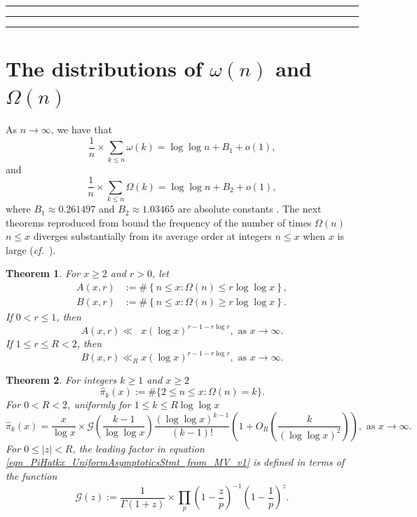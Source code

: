 \documentclass[11pt,reqno,a4letter]{article}
\numberwithin{equation}{section}
\numberwithin{figure}{section}
\numberwithin{table}{section}
\newcommand{\cf}{\textit{cf.\ }}
\theoremstyle{plain}
\newtheorem{theorem}{Theorem}
\numberwithin{theorem}{section}
\theoremstyle{definition}
\begin{document}
\smallskip\hrule\hrule\hrule\smallskip

%

\section{The distributions of $\omega(n)$ and $\Omega(n)$} 
\label{subSection_TheKnownDistsOfThePrimeOmegaFunctions_IntroResults_v1} 

As $n \rightarrow \infty$, we have that 
$$\frac{1}{n} \times \sum_{k \leq n} \omega(k) = \log\log n + B_1 + o(1),$$ 
and 
$$\frac{1}{n} \times \sum_{k \leq n} \Omega(k) = \log\log n + B_2 + o(1),$$ 
where $B_1 \approx 0.261497$ and $B_2 \approx 1.03465$ are 
absolute constants \cite[\S 22.10]{HARDYWRIGHT}. 
The next theorems reproduced from \cite[\S 7.4]{MV} bound the frequency of the 
number of times $\Omega(n)$ $n \leq x$ 
diverges substantially from its average order at integers $n \leq x$ 
when $x$ is large 
(\cf \cite{ERDOS-KAC-REF,BILLINGSLY-CLT-PRIMEDIVFUNC}). 

\begin{theorem} 
\label{theorem_MV_Thm7.20-init_stmt} 
For $x \geq 2$ and $r > 0$, let 
\begin{align*} 
A(x, r) & := \#\left\{n \leq x: \Omega(n) \leq r \log\log x\right\}, \\ 
B(x, r) & := \#\left\{n \leq x: \Omega(n) \geq r \log\log x\right\}. 
\end{align*} 
If $0 < r \leq 1$, then 
\[
A(x, r) \ll\phantom{_R} x (\log x)^{r-1 - r\log r}, \text{ as } x \rightarrow \infty. 
\]
If $1 \leq r \leq R < 2$, then 
\[
B(x, r) \ll_R x (\log x)^{r-1-r \log r}, \text{ as } x \rightarrow \infty. 
\]
\end{theorem} 

\begin{theorem}
\label{theorem_HatPi_ExtInTermsOfGz} 
For integers $k \geq 1$ and $x \geq 2$ 
$$\widehat{\pi}_k(x) := \#\{2 \leq n \leq x: \Omega(n)=k\}.$$ 
For $0 < R < 2$, uniformly for $1 \leq k \leq R \log\log x$ 
\begin{equation}
\label{eqn_PiHatkx_UniformAsymptoticsStmt_from_MV_v1}
\widehat{\pi}_k(x) = \frac{x}{\log x} \times \mathcal{G}\left(\frac{k-1}{\log\log x}\right) 
     \frac{(\log\log x)^{k-1}}{(k-1)!} \left(1 + O_R\left(\frac{k}{(\log\log x)^2}\right)\right), 
     \text{ as } x \rightarrow \infty. 
\end{equation}
For $0 \leq |z| < R$, the leading factor in 
equation \eqref{eqn_PiHatkx_UniformAsymptoticsStmt_from_MV_v1} 
is defined in terms of the function 
\[
\mathcal{G}(z) := \frac{1}{\Gamma(1+z)} \times 
	\prod_p \left(1-\frac{z}{p}\right)^{-1} \left(1-\frac{1}{p}\right)^z. 
\]
\end{theorem} 
\end{document}
